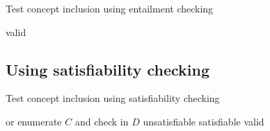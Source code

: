 \documentclass[11pt]{article}
\begin{document}
\begin{algorithm}[H]
  \caption{Test concept inclusion using entailment checking}
  \begin{algorithmic}[1]
        \State \Return valid

      \EndIf
    \EndFunction
  \end{algorithmic}
\end{algorithm}

\subsection{Using satisfiability checking}

\begin{algorithm}[H]
  \caption{Test concept inclusion using satisfiability checking}
  \begin{algorithmic}[1]
        \Comment or enumerate $C$ and check in $D$
        \State \Return unsatisfiable
        \State \Return satisfiable
      \Else
        \State \Return valid
      \EndIf
    \EndFunction
  \end{algorithmic}
\end{algorithm}
\end{document}
